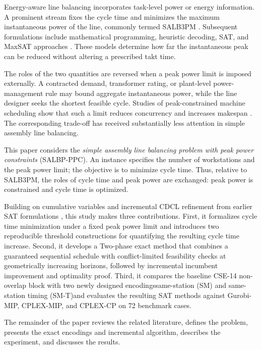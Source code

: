 \documentclass[]{interact}
\theoremstyle{plain}
\theoremstyle{definition}
\theoremstyle{remark}
\newcommand{\Problem}{SALBP-PPC}
\begin{document}
Energy-aware line balancing incorporates task-level power or energy information. A prominent stream fixes the cycle time and minimizes the maximum instantaneous power of the line, commonly termed SALB3PM \citep{Gianessi2019Simple}. Subsequent formulations include mathematical programming, heuristic decoding, SAT, and MaxSAT approaches \citep{Delorme2023A,Py2024POS,Zheng2024Optimizing,VanKieu2025Compact}. These models determine how far the instantaneous peak can be reduced without altering a prescribed takt time.

The roles of the two quantities are reversed when a peak power limit is imposed externally. A contracted demand, transformer rating, or plant-level power-management rule may bound aggregate instantaneous power, while the line designer seeks the shortest feasible cycle. Studies of peak-constrained machine scheduling show that such a limit reduces concurrency and increases makespan \citep{Fang2013Flow,Lv2024Considering,Chou2020An,Carlucci2021A,Li2024Energy-efficient}. The corresponding trade-off has received substantially less attention in simple assembly line balancing.

This paper considers the \emph{simple assembly line balancing problem with peak power constraints} (\Problem). An instance specifies the number of workstations and the peak power limit; the objective is to minimize cycle time. Thus, relative to SALB3PM, the roles of cycle time and peak power are exchanged: peak power is constrained and cycle time is optimized.

Building on cumulative variables and incremental CDCL refinement from earlier SAT formulations \citep{Py2024POS,VanKieu2025Compact}, this study makes three contributions. First, it formalizes cycle time minimization under a fixed peak power limit and introduces two reproducible threshold constructions for quantifying the resulting cycle time increase. Second, it develops a Two-phase exact method that combines a guaranteed sequential schedule with conflict-limited feasibility checks at geometrically increasing horizons, followed by incremental incumbent improvement and optimality proof. Third, it compares the baseline CSE-14 non-overlap block \citep{VanKieu2025Compact} with two newly designed encodings\textemdash{}same-station (SM) and same-station timing (SM-T)\textemdash{}and evaluates the resulting SAT methods against Gurobi-MIP, CPLEX-MIP, and CPLEX-CP on 72 benchmark cases.

The remainder of the paper reviews the related literature, defines the problem, presents the exact encodings and incremental algorithm, describes the experiment, and discusses the results.
\end{document}
